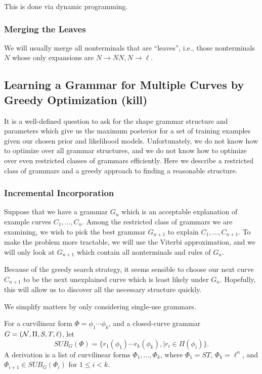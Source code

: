 \documentclass{article}
\begin{document}
This is done via dynamic programming.

\subsubsection{Merging the Leaves}

We will usually merge all nonterminals that are ``leaves'', i.e.,
those nonterminals $N$ whose only expansions are $N\to NN, N\to \ell$.

\subsection{Learning a Grammar for Multiple Curves by Greedy Optimization (kill)}

It is a well-defined question to ask for the shape grammar structure
and parameters which give us the maximum posterior for a set of
training examples given our chosen prior and likelihood
models. Unfortunately, we do not know how to optimize over all grammar
structures, and we do not know how to optimize over even restricted
classes of grammars efficiently. Here we describe a restricted class
of grammars and a greedy approach to finding a reasonable structure.

\subsubsection{Incremental Incorporation}

Suppose that we have a grammar $G_n$ which is an acceptable
explanation of example curves $C_1,\dots, C_n$.  Among the restricted
class of grammars we are examining, we wish to pick the best grammar
$G_{n+1}$ to explain $C_1,\dots, C_{n+1}$. To make the problem more
tractable, we will use the Viterbi approximation, and we will only
look at $G_{n+1}$ which contain all nonterminals and rules of $G_n$.

Because of the greedy search strategy, it seems sensible
to choose our next curve $C_{n+1}$ to be the next unexplained
curve which is least likely under $G_n$. Hopefully, this will
allow us to discover all the necessary structure quickly.

We simplify matters by only considering single-use grammars.

\begin{defn}
For a curvilinear form $\Phi = \phi_1 \cdots \phi_k$, and a
closed-curve grammar $G = ({\mathcal N},\Pi,S,T,\ell)$, let $$SUB_G(\Phi) = \{
r_1(\phi_1) \cdots r_k (\phi_k),\mid r_i \in \Pi(\phi_i) \}.$$ A derivation is
a list of curvilinear forms $\Phi_1,\dots, \Phi_k$, where $\Phi_1 =
ST$, $\Phi_k = \ell^n$, and $\Phi_{i+1} \in SUB_G(\Phi_i)$ for $1\le i
< k$.
\end{defn}
\end{document}
